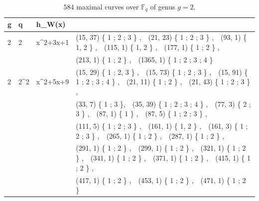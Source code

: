 \documentclass[11pt,reqno]{amsart}
\newcommand{\F}{\mathbb{F}}
\theoremstyle{definition}
\begin{document}
{\tiny

\begin{longtable}{MMMM}
\caption{$584$ maximal curves over $\F_q$ of genus $g=2$.}\label{tabMax2} \\
g & q & h_W(x) &   \\
 & 2 & x^2+3x+1 & (15, 37) \{ 1 ; 2 ; 3 \} , \,\,  (21, 23) \{ 1 ; 2 ; 3 \} , \,\,  (93, 1) \{ 1, 2 \} , \,\,  (115, 1) \{ 1, 2 \} , \,\,  (177, 1) \{ 1 ; 2 \} , \\
  & & & (213, 1) \{ 1 ; 2 \} , \,\,  (1365, 1) \{ 1 ; 2 ; 3 ; 4 \} \\
  \midrule
  
 2 & 2^2 & x^2+5x+9 & (15, 29) \{ 1 ; 2, 3 \} , \,\,  (15, 73) \{ 1 ; 2 ; 3 \} , \,\,  (15, 91) \{ 1 ; 2 ; 3 ; 4 \} , \,\,  (21, 11) \{ 1 ; 2 \} , \,\,  (21, 43) \{ 1 ; 2 ; 3 \} , \\
  & & & (33, 7) \{ 1 ; 3 \}, \,\,  (35, 39) \{ 1 ; 2 ; 3 ; 4 \} ,  \,\, (77, 3) \{ 2 ; 3 \} , \,\, (87, 1) \{ 1 \} , \,\, (87, 5) \{ 1 ; 2 ; 3 \} ,  \\
  & & &  (111, 5) \{ 1 ; 2 ; 3 \} , \,\, (161, 1) \{ 1, 2 \} ,   \,\,  (161, 3) \{ 1 ; 2 ; 3 \} , \,\, (265, 1) \{ 1 ; 2 \} , \,\, (287, 1) \{ 1 ; 2 \} ,  \\
  & & &  (291, 1) \{ 1 ; 2 \} , \,\, (299, 1) \{ 1 ; 2 \} , \,\,  (321, 1) \{ 1 ; 2 \} , \,\, (341, 1) \{ 1 ; 2 \} , \,\, (371, 1) \{ 1 ; 2 \} , \,\,  (415, 1) \{ 1 ; 2 \} ,  \\
  & & &  (417, 1) \{ 1 ; 2 \} ,  \,\,  (453, 1) \{ 1 ; 2 \} , \,\,  (471, 1) \{ 1 ; 2 \}  \\
  \midrule 
  

\end{longtable}}
\end{document}
